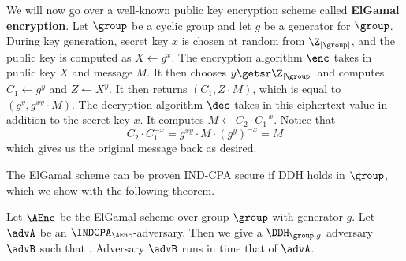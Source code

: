 We will now go over a well-known public key encryption scheme called \textbf{ElGamal encryption}. Let $\group$ be a cyclic group and let $g$ be a generator for $\group$. During key generation, secret key $x$ is chosen at random from $\Z_{|\group|}$, and the public key is computed as $X \gets g^x$. The encryption algorithm $\enc$ takes in public key $X$ and message $M$. It then chooses $y\getsr \Z_{|\group|}$ and computes $C_1 \gets g^y$ and $Z \gets X^y$. It then returns $(C_1, Z \cdot M)$, which is equal to $(g^y, g^{xy} \cdot M)$. The decryption algorithm $\dec$ takes in this ciphertext value in addition to the secret key $x$. It computes $M \gets C_2 \cdot C_1^{-x}$. Notice that
\begin{equation*}
	C_2 \cdot C_1^{-x} = g^{xy} \cdot M \cdot (g^y)^{-x} = M
\end{equation*}
which gives us the original message back as desired. 

The ElGamal scheme can be proven IND-CPA secure if DDH holds in $\group$, which we show with the following theorem. 

\begin{theorem}
\label{proof:elgamal}
	Let $\AEnc$ be the ElGamal scheme over group $\group$ with generator $g$. 
	Let $\advA$ be an $\INDCPA_\AEnc$-adversary. Then we give a $\DDH_{\group,g}$ 
	adversary $\advB$ such that 
	\bnm
	\AdvINDCPA{\AEnc}{\advA} \cdotsm {} \;.
	\enm
	Adversary $\advB$ runs in time that of $\advA$. 
\end{theorem} 
	
